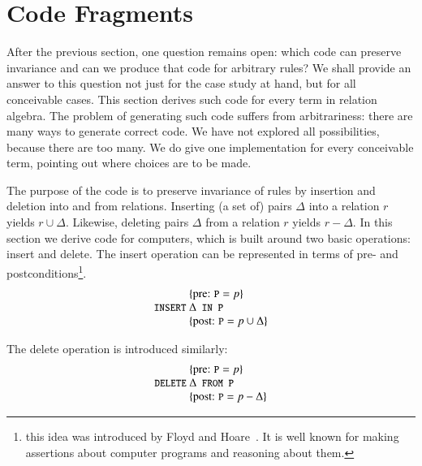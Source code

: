 \documentclass{elsarticle}
\begin{document}
\section{Code Fragments}
\label{sct:Code Fragments}
	After the previous section, one question remains open: which code can preserve invariance and can we produce that code for arbitrary rules?
	We shall provide an answer to this question not just for the case study at hand, but for all conceivable cases.
	This section derives such code for every term in relation algebra.
	The problem of generating such code suffers from arbitrariness: there are many ways to generate correct code.
	We have not explored all possibilities, because there are too many.
	We do give one implementation for every conceivable term, pointing out where choices are to be made.

	The purpose of the code is to preserve invariance of rules by insertion and deletion into and from relations.
	Inserting (a set of) pairs $\Delta$ into a relation $r$ yields $r\cup\Delta$.
	Likewise, deleting pairs $\Delta$ from a relation $r$ yields $r-\Delta$.
	In this section we derive code for computers,
	which is built around two basic operations: insert and delete.
	The insert operation can be represented in terms of pre- and postconditions\footnote{this idea
	was introduced by Floyd and Hoare~\cite{Floyd1967,Hoare1969}.
	It is well known for making assertions about computer programs and reasoning about them.}.
\[\begin{array}{r@{~}l}
&\{\text{pre: }\code{P}=p\}\\
\code{INSERT}&\Delta\code{ IN P}\\
&\{\text{post: }\code{P}=p\cup\Delta\}\\
\end{array}\]

	The delete operation is introduced similarly:
\[\begin{array}{r@{~}l}
&\{\text{pre: }\code{P}=p\}\\
\code{DELETE}&\Delta\code{ FROM P}\\
&\{\text{post: }\code{P}=p-\Delta\}\\
\end{array}\]
	
\end{document}
